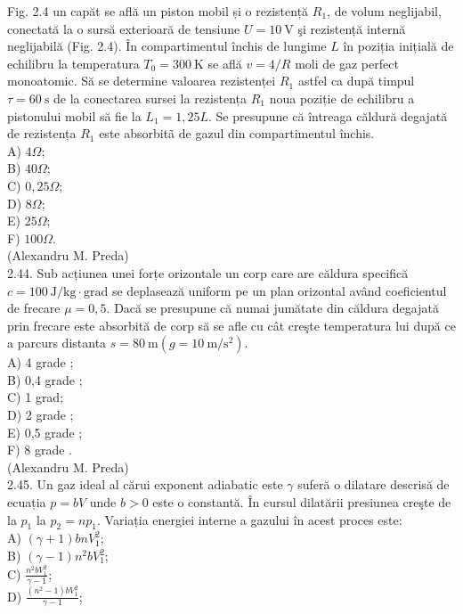 \documentclass[10pt]{article}
\begin{document}
Fig. 2.4 un capăt se află un piston mobil și o rezistență $R_{1}$, de volum neglijabil, conectată la o sursă exterioară de tensiune $U=10 \mathrm{~V}$ şi rezistență internă neglijabilă (Fig. 2.4). În compartimentul închis de lungime $L$ în poziția inițială de echilibru la temperatura $T_{0}=300 \mathrm{~K}$ se află $v=4 / R$ moli de gaz perfect monoatomic. Să se determine valoarea rezistenței $R_{1}$ astfel ca după timpul $\tau=60 \mathrm{~s}$ de la conectarea sursei la rezistența $R_{1}$ noua poziție de echilibru a pistonului mobil să fie la $L_{1}=1,25 L$. Se presupune că întreaga căldură degajată de rezistența $R_{1}$ este absorbitã de gazul din compartimentul închis.\\
A) $4 \Omega$;\\
B) $40 \Omega$;\\
C) $0,25 \Omega$;\\
D) $8 \Omega$;\\
E) $25 \Omega$;\\
F) $100 \Omega$.\\
(Alexandru M. Preda)\\
2.44. Sub acțiunea unei forțe orizontale un corp care are căldura specifică $c=100 \mathrm{~J} / \mathrm{kg} \cdot \mathrm{grad}$ se deplasează uniform pe un plan orizontal având coeficientul de frecare $\mu=0,5$. Dacă se presupune că numai jumătate din căldura degajată prin frecare este absorbită de corp să se afle cu cât creşte temperatura lui după ce a parcurs distanta $s=80 \mathrm{~m}\left(g=10 \mathrm{~m} / \mathrm{s}^{2}\right)$.\\
A) 4 grade ;\\
B) 0,4 grade ;\\
C) 1 grad;\\
D) 2 grade ;\\
E) 0,5 grade ;\\
F) 8 grade .\\
(Alexandru M. Preda)\\
2.45. Un gaz ideal al cărui exponent adiabatic este $\gamma$ suferă o dilatare descrisă de ecuația $p=b V$ unde $b>0$ este o constantă. În cursul dilatării presiunea creşte de la $p_{1}$ la $p_{2}=n p_{1}$. Variația energiei interne a gazului în acest proces este:\\
A) $(\gamma+1) b n V_{1}^{2}$;\\
B) $(\gamma-1) n^{2} b V_{1}^{2}$;\\
C) $\frac{n^{2} b V_{1}^{2}}{\gamma-1}$;\\
D) $\frac{\left(n^{2}-1\right) b V_{1}^{2}}{\gamma-1}$;\\
\end{document}
